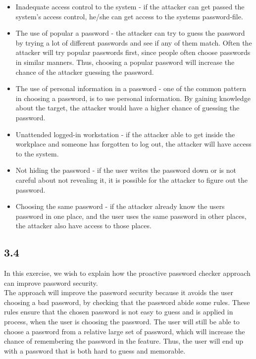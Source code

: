 \documentclass{article}
\begin{document}
\begin{itemize}
    \item Inadequate access control to the system - if the attacker can get passed the system's access control, he/she can get access to the systems password-file.  

    \item The use of popular a password - the attacker can try to guess the password by trying a lot of different passwords and see if any of them match. Often the attacker will try popular passwords first, since people often choose passwords in similar manners. Thus, choosing a popular password will increase the chance of the attacker guessing the password. 
    
    \item The use of personal information in a password - one of the common pattern in choosing a password, is to use personal information. By gaining knowledge about the target, the attacker would have a higher chance of guessing the password. 
    
    \item Unattended logged-in workstation - if the attacker able to get inside the workplace and someone has forgotten to log out, the attacker will have access to the system. 
    
    \item Not hiding the password - if the user writes the password down or is not careful about not revealing it, it is possible for the attacker to figure out the password. 

    \item Choosing the same password - if the attacker already know the users password in one place, and the user uses the same password in other places, the attacker also have access to those places. 
    
\end{itemize}

\subsection{3.4}
In this exercise, we wish to explain how the proactive password checker approach can improve password security.\\ 

The approach will improve the password security because it avoids the user choosing a bad password, by checking that the password abide some rules. These rules ensure that the chosen password is not easy to guess and is applied in process, when the user is choosing the password. The user will still be able to choose a password from a relative large set of password, which will increase the chance of remembering the password in the feature. Thus, the user will end up with a password that is both hard to guess and memorable. 
\end{document}
